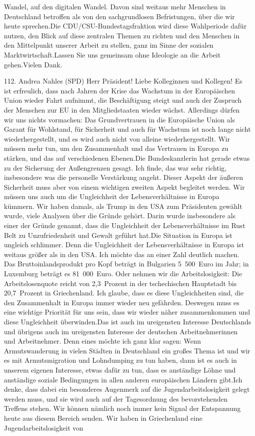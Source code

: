 \documentclass{article}
\begin{document}
Wandel, auf den digitalen Wandel. Davon sind weitaus mehr Menschen in Deutschland betroffen als von den sachgrundlosen Befristungen, über die wir heute sprechen.Die CDU/CSU-Bundestagsfraktion wird diese Wahlperiode dafür nutzen, den Blick auf diese zentralen Themen zu richten und den Menschen in den Mittelpunkt unserer Arbeit zu stellen, ganz im Sinne der sozialen Marktwirtschaft.Lassen Sie uns gemeinsam ohne Ideologie an die Arbeit gehen.Vielen Dank.




	112. Andrea Nahles (SPD) Herr Präsident! Liebe Kolleginnen und Kollegen! Es ist erfreulich, dass nach Jahren der Krise das Wachstum in der Europäischen Union wieder Fahrt aufnimmt, die Beschäftigung steigt und auch der Zuspruch der Menschen zur EU in den Mitgliedstaaten wieder wächst. Allerdings dürfen wir uns nichts vormachen: Das Grundvertrauen in die Europäische Union als Garant für Wohlstand, für Sicherheit und auch für Wachstum ist noch lange nicht wiederhergestellt, und es wird auch nicht von alleine wiederhergestellt. Wir müssen mehr tun, um den Zusammenhalt und das Vertrauen in Europa zu stärken, und das auf verschiedenen Ebenen.Die Bundeskanzlerin hat gerade etwas zu der Sicherung der Außengrenzen gesagt. Ich finde, das war sehr richtig, insbesondere was die personelle Verstärkung angeht. Dieser Aspekt der äußeren Sicherheit muss aber von einem wichtigen zweiten Aspekt begleitet werden. Wir müssen uns auch um die Ungleichheit der Lebensverhältnisse in Europa kümmern. Wir haben damals, als Trump in den USA zum Präsidenten gewählt wurde, viele Analysen über die Gründe gehört. Darin wurde insbesondere als einer der Gründe genannt, dass die Ungleichheit der Lebensverhältnisse im Rust Belt zu Unzufriedenheit und Gewalt geführt hat.Die Situation in Europa ist ungleich schlimmer. Denn die Ungleichheit der Lebensverhältnisse in Europa ist weitaus größer als in den USA. Ich möchte das an einer Zahl deutlich machen. Das Bruttoinlandsprodukt pro Kopf beträgt in Bulgarien 5 500 Euro im Jahr; in Luxemburg beträgt es 81 000 Euro. Oder nehmen wir die Arbeitslosigkeit: Die Arbeitslosenquote reicht von 2,3 Prozent in der tschechischen Hauptstadt bis 20,7 Prozent in Griechenland. Ich glaube, dass es diese Ungleichheiten sind, die den Zusammenhalt in Europa immer wieder neu gefährden. Deswegen muss es eine wichtige Priorität für uns sein, dass wir wieder näher zusammenkommen und diese Ungleichheit überwinden.Das ist auch im ureigensten Interesse Deutschlands und übrigens auch im ureigensten Interesse der deutschen Arbeitnehmerinnen und Arbeitnehmer. Denn eines möchte ich ganz klar sagen: Wenn Armutswanderung in vielen Städten in Deutschland ein großes Thema ist und wir es mit Armutsmigration und Lohndumping zu tun haben, dann ist es auch in unserem eigenen Interesse, etwas dafür zu tun, dass es anständige Löhne und anständige soziale Bedingungen in allen anderen europäischen Ländern gibt.Ich denke, dass dabei ein besonderes Augenmerk auf die Jugendarbeitslosigkeit gelegt werden muss, und sie wird auch auf der Tagesordnung des bevorstehenden Treffens stehen. Wir können nämlich noch immer kein Signal der Entspannung heute aus diesem Bereich senden. Wir haben in Griechenland eine Jugendarbeitslosigkeit von 
\end{document}

